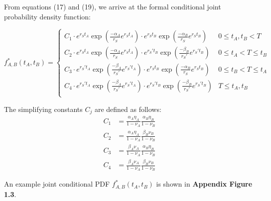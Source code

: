 \documentclass{article}
\begin{document}
From equations (17) and (19), we arrive at the formal conditional joint probability density function:


\begin{equation}
f_{A,B}^*(t_A,t_B)=\begin{cases}
		C_1\cdot e^{r_S t_A} \exp(\frac{-\alpha_A}{r_S} e^{r_S t_A}) \cdot e^{r_S t_B} \exp(\frac{-\alpha_B}{r_S} e^{r_S t_B}) & 0\leq t_A,t_B<T \\
		C_2\cdot e^{r_S t_A} \exp(\frac{-\alpha_A}{r_S} e^{r_S t_A}) \cdot e^{r_S' t_B} \exp(\frac{-\beta_B}{r_S'} e^{r_S' t_B}) & 0\leq t_A<T \leq t_B \\
		C_3\cdot e^{r_S' t_A} \exp(\frac{-\beta_A}{r_S'} e^{r_S' t_A}) \cdot e^{r_S t_B} \exp(\frac{-\alpha_B}{r_S} e^{r_S t_B}) & 0\leq t_B<T \leq t_A \\
		C_4\cdot e^{r_S' t_A} \exp(\frac{-\beta_A}{r_S'} e^{r_S' t_A}) \cdot e^{r_S' t_B} \exp(\frac{-\beta_B}{r_S'} e^{r_S' t_B}) & T\leq t_A,t_B \\ 
       \end{cases}
\end{equation}

The simplifying constants $C_j$ are defined as follows:
\begin{equation}
\begin{split}
C_1 &= \frac{\alpha_A \eta_A}{1-\nu_A}\frac{\alpha_B \eta_B}{1-\nu_B} \\
C_2 &= \frac{\alpha_A \eta_A}{1-\nu_A}\frac{\beta_B \nu_B}{1-\nu_B} \\
C_3 &= \frac{\beta_A \nu_A}{1-\nu_A}\frac{\alpha_B \eta_B}{1-\nu_B} \\
C_4 &= \frac{\beta_A \nu_A}{1-\nu_A}\frac{\beta_B \nu_B}{1-\nu_B}
\end{split}
\end{equation}

An example joint conditional PDF $f_{A,B}^*(t_{A},t_{B})$ is shown in \textbf{Appendix Figure 1.3}.
\end{document}
